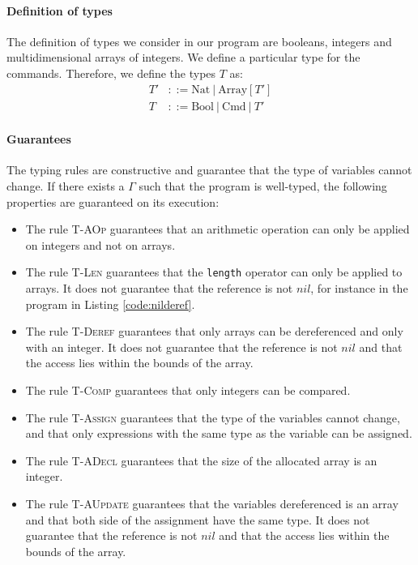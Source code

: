 \documentclass{article}
\begin{document}
\paragraph{Definition of types}
The definition of types we consider in our program are booleans, integers and multidimensional arrays of integers. We define a particular type for the commands. Therefore, we define the types \(T\) as:
\begin{equation*} \label{eq1}
\begin{split}
T' & ::= \text{Nat}\ |\ \text{Array}[T']\\
T  & ::= \text{Bool}\ |\ \text{Cmd}\ |\ T'
\end{split}
\end{equation*}

\paragraph{Guarantees}
The typing rules are constructive and guarantee that the type of variables cannot change.
If there exists a \(\Gamma\) such that the program is well-typed, the following properties are guaranteed on its execution:
\begin{itemize}
 \item The rule \textsc{T-AOp} guarantees that an arithmetic operation can only be applied on integers and not on arrays.
 \item The rule \textsc{T-Len} guarantees that the \texttt{length} operator can only be applied to arrays. It does not guarantee that the reference is not \(nil\), for instance in the program in Listing \ref{code:nilderef}.
 \item The rule \textsc{T-Deref} guarantees that only arrays can be dereferenced and only with an integer. It does not guarantee that the reference is not \(nil\) and that the access lies within the bounds of the array.
 \item The rule \textsc{T-Comp} guarantees that only integers can be compared.
 \item The rule \textsc{T-Assign} guarantees that the type of the variables cannot change, and that only expressions with the same type as the variable can be assigned. 
 \item The rule \textsc{T-ADecl} guarantees that the size of the allocated array is an integer.
 \item The rule \textsc{T-AUpdate} guarantees that the variables dereferenced is an array and that both side of the assignment have the same type. It does not guarantee that the reference is not \(nil\) and that the access lies within the bounds of the array.
\end{itemize}
\end{document}
